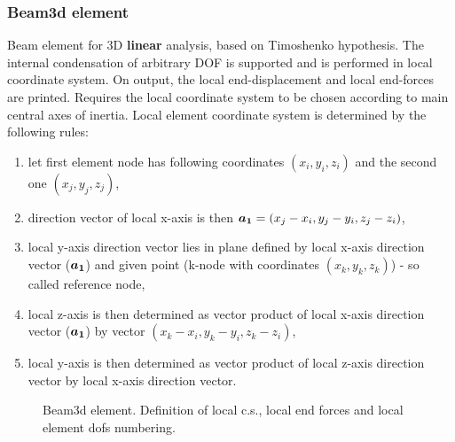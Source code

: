 \documentclass[a4paper]{article}
\newcommand{\mbf}[1]{\mbox{\boldmath$#1$}}
\begin{document}
\subsubsection{Beam3d element}
Beam element for 3D {\bf linear} analysis, based on Timoshenko hypothesis. The internal condensation
of arbitrary DOF is supported and is performed in local coordinate
system. On output, the local end-displacement and local end-forces are
printed. Requires the local coordinate system to be chosen according
to main central axes of inertia. Local element 
coordinate system is determined by the following rules:
\begin{enumerate}
\item let first element node has following coordinates $(x_i, y_i, z_i)$
and the second one $(x_j, y_j, z_j)$,
\item direction vector of local x-axis is then $\mbf{a_1} = (x_j-x_i, y_j-y_i, z_j-z_i)$,
\item local y-axis direction vector lies in plane defined by local
x-axis direction vector ($\mbf{a_1}$) and given
point (k-node with coordinates $(x_k, y_k, z_k)$) - so called reference node,
\item local z-axis is then determined as vector product of local
x-axis direction vector ($\mbf{a_1}$) by vector $(x_k-x_i, y_k-y_i, z_k-z_i)$,
\item local y-axis is then determined as vector product of local
z-axis direction vector by local x-axis direction vector. 
\end{enumerate}
\begin{figure}[tb]
 \centering
 \begin{makeimage}
   
 \end{makeimage}
 \caption{Beam3d element. Definition of local c.s., local end forces
 and local element dofs numbering.}
 \label{beam3dfig}
\end{figure}
\end{document}
